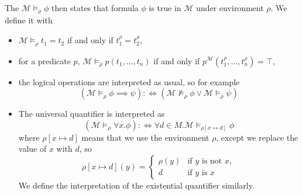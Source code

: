 The  $\mathcal{M} \models_\rho \phi$ then states
that formula $\phi$ is true in $\mathcal{M}$ under environment $\rho$.
We define it with
\begin{itemize}
\item $\mathcal{M} \models_\rho t_1 = t_2$ if and only if $t_1^\rho = t_2^\rho$,
\item for a predicate $p$, $\mathcal{M} \models_\rho p(t_1, \ldots, t_n)$ if and
  only if $p^{\mathcal{M}}(t_1^\rho, \ldots, t_n^\rho) = \top$,
\item the logical operations are interpreted as usual, so for example
  \[
	(\mathcal{M} \models_\rho \phi \implies \psi)
	:\iff \left(
	  \mathcal{M} \nvDash_\rho \phi \lor \mathcal{M} \models_\rho \psi
	\right)
  \]
\item The universal quantifier is interpreted as
  \[
	(\mathcal{M} \models_\rho \forall x. \phi)
	:\iff \forall d \in M . \mathcal{M} \models_{\rho[x \mapsto d]} \phi
  \]
  where $\rho[x \mapsto d]$ means that we use the environment $\rho$, except we
  replace the value of $x$ with $d$, so
  \[
	\rho[x \mapsto d](y) =
	\begin{cases}
	  \rho(y) & \text{if $y$ is not $x$}, \\
	  d & \text{if $y$ is $x$}
	\end{cases}
  \]
  We define the interpretation of the existential quantifier similarly.
\end{itemize}

